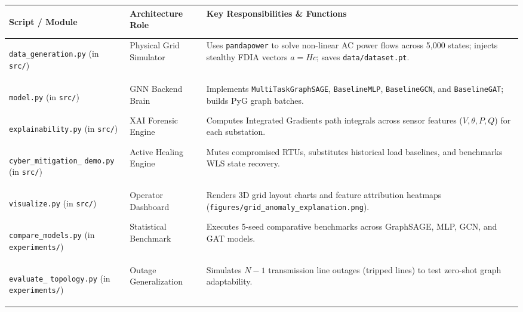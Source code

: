 \documentclass[10pt,a4paper]{article}
\begin{document}
\begin{table}[h!]
\centering
\small
\begin{tabularx}{\textwidth}{>{\bfseries\raggedright\arraybackslash}p{3.2cm} >{\raggedright\arraybackslash}p{3.4cm} >{\raggedright\arraybackslash}X}
\toprule
\textbf{Script / Module} & \textbf{Architecture Role} & \textbf{Key Responsibilities \& Functions} \\
\midrule
\texttt{data\_generation.py} \newline \textmd{\scriptsize(in \texttt{src/})} & Physical Grid Simulator & Uses \texttt{pandapower} to solve non-linear AC power flows across 5,000 states; injects stealthy FDIA vectors $a = Hc$; saves \texttt{data/dataset.pt}. \\
\addlinespace
\texttt{model.py} \newline \textmd{\scriptsize(in \texttt{src/})} & GNN Backend Brain & Implements \texttt{MultiTaskGraphSAGE}, \texttt{BaselineMLP}, \texttt{BaselineGCN}, and \texttt{BaselineGAT}; builds PyG graph batches. \\
\addlinespace
\texttt{explainability.py} \newline \textmd{\scriptsize(in \texttt{src/})} & XAI Forensic Engine & Computes Integrated Gradients path integrals across sensor features ($V, \theta, P, Q$) for each substation. \\
\addlinespace
\texttt{cyber\_mitigation\_} \newline \texttt{demo.py} \newline \textmd{\scriptsize(in \texttt{src/})} & Active Healing Engine & Mutes compromised RTUs, substitutes historical load baselines, and benchmarks WLS state recovery. \\
\addlinespace
\texttt{visualize.py} \newline \textmd{\scriptsize(in \texttt{src/})} & Operator Dashboard & Renders 3D grid layout charts and feature attribution heatmaps (\texttt{figures/grid\_anomaly\_explanation.png}). \\
\addlinespace
\texttt{compare\_models.py} \newline \textmd{\scriptsize(in \texttt{experiments/})} & Statistical Benchmark & Executes 5-seed comparative benchmarks across GraphSAGE, MLP, GCN, and GAT models. \\
\addlinespace
\texttt{evaluate\_} \newline \texttt{topology.py} \newline \textmd{\scriptsize(in \texttt{experiments/})} & Outage Generalization & Simulates $N-1$ transmission line outages (tripped lines) to test zero-shot graph adaptability. \\

\end{tabularx}
\end{table}
\end{document}
